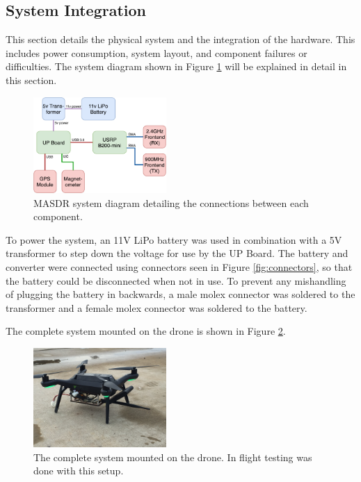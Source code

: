 \documentclass[journal,transmag]{IEEEtran}
\begin{document}
\subsection{System Integration}
This section details the physical system and the integration of the hardware. This includes power consumption, system layout, and component failures or difficulties. The system diagram shown in Figure \ref{fig:masdr_system_diagram} will be explained in detail in this section.
\begin{figure}[ht!]
  \centering
  \includegraphics[width=0.45\textwidth]{img/masdr_system_diagram.png}
  \caption{MASDR system diagram detailing the connections between each component.}
  \label{fig:masdr_system_diagram}
\end{figure}\par
\par To power the system, an 11V LiPo battery was used in combination with a 5V transformer to step down the voltage for use by the UP Board. The battery and converter were connected using connectors seen in Figure \ref{fig:connectors}, so that the battery could be disconnected when not in use. To prevent any mishandling of plugging the battery in backwards, a male molex connector was soldered to the transformer and a female molex connector was soldered to the battery.
\par The complete system mounted on the drone is shown in Figure \ref{fig:drone_and_box}.
\begin{figure}[ht!]
  \centering
  \includegraphics[width=0.45\textwidth]{img/drone_and_box.jpg}
  \caption{The complete system mounted on the drone. In flight testing was done with this setup.}
  \label{fig:drone_and_box}
\end{figure}
\end{document}
